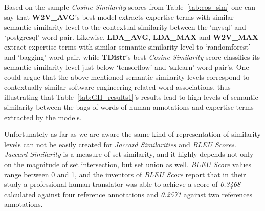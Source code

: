             \begin{table}
                  \centering
                  \caption{Example of Cosine Similarity Scores between Word-Pairs} \label{tab:cos_sim}
                  \vspace{6pt} %
            \end{table}
            
            Based on the sample \emph{Cosine Similarity} scores from Table~\ref{tab:cos_sim} one can say that \textbf{W2V\_AVG}'s best model extracts expertise terms with similar semantic similarity level to the contextual similarity between the `mysql' and `postgresql' word-pair. Likewise, \textbf{LDA\_AVG}, \textbf{LDA\_MAX} and \textbf{W2V\_MAX} extract expertise terms with similar semantic similarity level to `randomforest' and `bagging' word-pair, while \textbf{TDistr}'s best \emph{Cosine Similarity} score classifies its semantic similarity level just below `tensorflow' and `sklearn' word-pair's. One could argue that the above mentioned semantic similarity levels correspond to contextually similar software engineering related word associations, thus illustrating that Table~\ref{tab:GH_results1}'s results lead to high levels of semantic similarity between the bags of words of human annotations and expertise terms extracted by the models.
            
            Unfortunately as far as we are aware the same kind of representation of similarity levels can not be easily created for \emph{Jaccard Similarities} and \emph{BLEU Scores}. \emph{Jaccard Similarity} is a measure of set similarity, and it highly depends not only on the magnitude of set intersection, but set union as well. \emph{BLEU Score} values range between 0 and 1, and the inventors of \emph{BLEU Score} report that in their study a professional human translator was able to achieve a score of \emph{0.3468} calculated against four reference annotations and \emph{0.2571} against two references annotations\cite{papineni2002bleu}.
        
